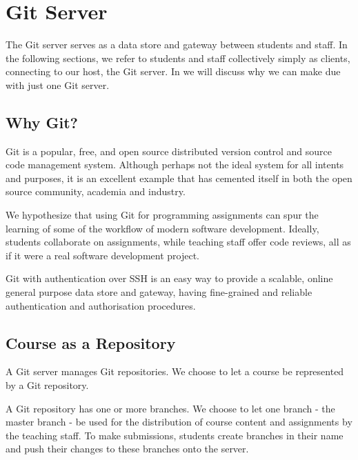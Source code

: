 
\section{Git Server}

The Git server serves as a data store and gateway between students and staff.
In the following sections, we refer to students and staff collectively simply
as clients, connecting to our host, the Git server. In
 we will discuss why we can make due
with just one Git server.

\subsection{Why Git?}

Git is a popular\cite{ohloh-2014}, free, and open source distributed version
control and source code management system\cite{git-2014}. Although perhaps not
the ideal system for all intents and purposes, it is an excellent example that
has cemented itself in both the open source community, academia and
industry\cite{gitprojects-2014}.


We hypothesize that using Git for programming assignments can spur the learning
of some of the workflow of modern software development. Ideally, students
collaborate on assignments, while teaching staff offer code reviews, all as if
it were a real software development project.

Git with authentication over SSH is an easy way to provide a scalable, online
general purpose data store and gateway, having fine-grained and reliable
authentication and authorisation procedures.

\subsection{Course as a Repository}

A Git server manages Git repositories. We choose to let a course be represented
by a Git repository.

A Git repository has one or more branches. We choose to let one branch - the
master branch - be used for the distribution of course content and assignments
by the teaching staff. To make submissions, students create branches in their
name and push their changes to these branches onto the server.

